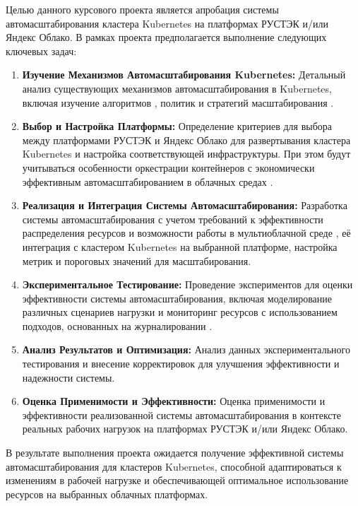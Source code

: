 Целью данного курсового проекта является апробация системы автомасштабирования
кластера Kubernetes на платформах РУСТЭК и/или Яндекс Облако. В рамках проекта
предполагается выполнение следующих ключевых задач:

\begin{enumerate}
 \item \textbf{Изучение Механизмов Автомасштабирования Kubernetes:} Детальный
анализ существующих механизмов автомасштабирования в Kubernetes, включая
изучение алгоритмов \cite{senjab2023survey}, политик и стратегий масштабирования 
\cite{tran2022survey, qu2018auto, millnert2020holoscale}.
 
 \item \textbf{Выбор и Настройка Платформы:} Определение критериев для выбора
между платформами РУСТЭК и Яндекс Облако для развертывания кластера Kubernetes и
настройка соответствующей инфраструктуры. При этом будут учитываться особенности 
оркестрации контейнеров с экономически эффективным автомасштабированием в облачных средах 
\cite{rodriguez2020container}.
 
 \item \textbf{Реализация и Интеграция Системы Автомасштабирования:} Разработка
системы автомасштабирования с учетом требований к эффективности распределения ресурсов 
\cite{zhong2020cost} и возможности работы в мультиоблачной среде \cite{jiang2020cloud}, 
её интеграция с кластером Kubernetes на выбранной
платформе, настройка метрик и пороговых значений для масштабирования.
 
 \item \textbf{Экспериментальное Тестирование:} Проведение экспериментов для
оценки эффективности системы автомасштабирования, включая моделирование
различных сценариев нагрузки и мониторинг ресурсов с использованием подходов, 
основанных на журналировании \cite{agrawal2018log}.
 
 \item \textbf{Анализ Результатов и Оптимизация:} Анализ данных
экспериментального тестирования и внесение корректировок для улучшения
эффективности и надежности системы.
 
 \item \textbf{Оценка Применимости и Эффективности:} Оценка применимости и
эффективности реализованной системы автомасштабирования в контексте реальных
рабочих нагрузок на платформах РУСТЭК и/или Яндекс Облако.
\end{enumerate}

В результате выполнения проекта ожидается получение эффективной системы
автомасштабирования для кластеров Kubernetes, способной адаптироваться к
изменениям в рабочей нагрузке и обеспечивающей оптимальное использование
ресурсов на выбранных облачных платформах.